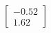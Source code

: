 \documentclass[preview]{standalone}
\begin{document}
\begin{align*}
\begin{bmatrix} -0.52 \\ 1.62 \end{bmatrix}
\end{align*}
\end{document}
